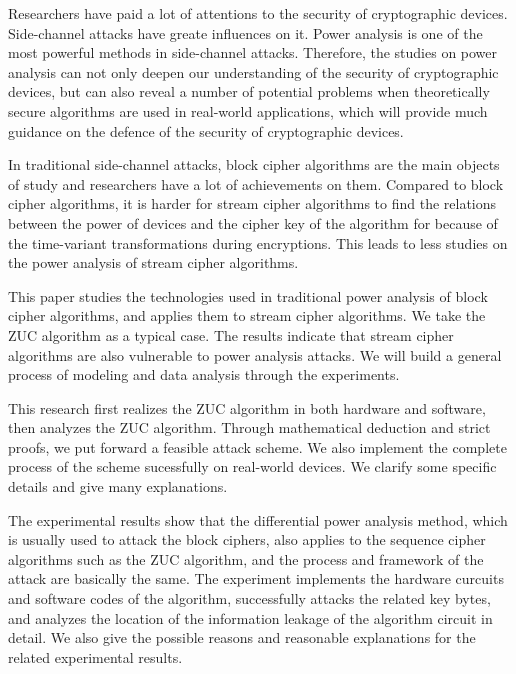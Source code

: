 \begin{englishabstract}
Researchers have paid a lot of attentions to the security of cryptographic devices. Side-channel attacks have greate influences on it. Power analysis is one of the most powerful methods in side-channel attacks. Therefore, the studies on power analysis can not only deepen our understanding of the security of cryptographic devices, but can also reveal a number of potential problems when theoretically secure algorithms are used in real-world applications, which will provide much guidance on the defence of the security of cryptographic devices.

In traditional side-channel attacks, block cipher algorithms are the main objects of study and researchers have a lot of achievements on them. Compared to block cipher algorithms, it is harder for stream cipher algorithms to find the relations between the power of devices and the cipher key of the algorithm for because of the time-variant transformations during encryptions. This leads to less studies on the power analysis of stream cipher algorithms.

This paper studies the technologies used in traditional power analysis of block cipher algorithms, and applies them to stream cipher algorithms. We take the ZUC algorithm as a typical case. The results indicate that stream cipher algorithms are also vulnerable to power analysis attacks. We will build a general process of modeling and data analysis through the experiments.

This research first realizes the ZUC algorithm in both hardware and software, then analyzes the ZUC algorithm. Through mathematical deduction and strict proofs, we put forward a feasible attack scheme. We also implement the complete process of the scheme sucessfully on real-world devices. We clarify some specific details and give many explanations.

The experimental results show that the differential power analysis method, which is usually used to attack the block ciphers, also applies to the sequence cipher algorithms such as the ZUC algorithm, and the process and framework of the attack are basically the same. The experiment implements the hardware curcuits and software codes of the algorithm, successfully attacks the related key bytes, and analyzes the location of the information leakage of the algorithm circuit in detail. We also give the possible reasons and reasonable explanations for the related experimental results.

\end{englishabstract}

